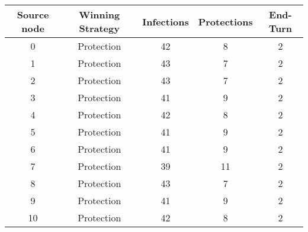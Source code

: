 \documentclass[results.tex]{subfiles}
\begin{document}
    \begin{center}
        \begin{tabular}{| c || c | c | c | c |}
            \hline
            {\bfseries Source node} & {\bfseries Winning Strategy} & {\bfseries Infections} & {\bfseries Protections}
            & {\bfseries End-Turn}
            \\  %
            \hline\hline
            0                       & Protection                   & 42                     & 8                       & 2                    \\
            \hline
            1                       & Protection                   & 43                     & 7                       & 2                    \\
            \hline
            2                       & Protection                   & 43                     & 7                       & 2                    \\
            \hline
            3                       & Protection                   & 41                     & 9                       & 2                    \\
            \hline
            4                       & Protection                   & 42                     & 8                       & 2                    \\
            \hline
            5                       & Protection                   & 41                     & 9                       & 2                    \\
            \hline
            6                       & Protection                   & 41                     & 9                       & 2                    \\
            \hline
            7                       & Protection                   & 39                     & 11                      & 2                    \\
            \hline
            8                       & Protection                   & 43                     & 7                       & 2                    \\
            \hline
            9                       & Protection                   & 41                     & 9                       & 2                    \\
            \hline
            10                      & Protection                   & 42                     & 8                       & 2                    \\

\end{tabular}
\end{center}
\end{document}

